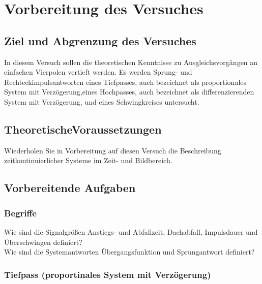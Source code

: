 \section{Vorbereitung des Versuches}

\subsection{Ziel und Abgrenzung des Versuches}

In diesem Versuch sollen die theoretischen Kenntnisse zu Ausgleichsvorgängen an 
einfachen Vierpolen vertieft werden. Es werden Sprung- und Rechteckimpulsantworten eines 
Tiefpasses, auch bezeichnet als proportionales System mit Verzögerung,eines Hochpasses, 
auch bezeichnet als differenzierenden System mit Verzögerung, und eines Schwingkreises untersucht.\\
\newline

\subsection{TheoretischeVoraussetzungen}

Wiederholen Sie in Vorbereitung auf diesen Versuch die Beschreibung 
zeitkontinuierlicher Systeme im Zeit- und Bildbereich.
\newline


\subsection{Vorbereitende Aufgaben}

\subsubsection{Begriffe}

Wie sind die Signalgrößen Anstiegs- und Abfallzeit, Dachabfall, Impulsdauer und Überschwingen definiert?\\
\newline%
Wie sind die Systemantworten Übergangsfunktion und Sprungantwort definiert?\\
\newline%

\subsubsection{Tiefpass (proportinales System mit Verzögerung)}

